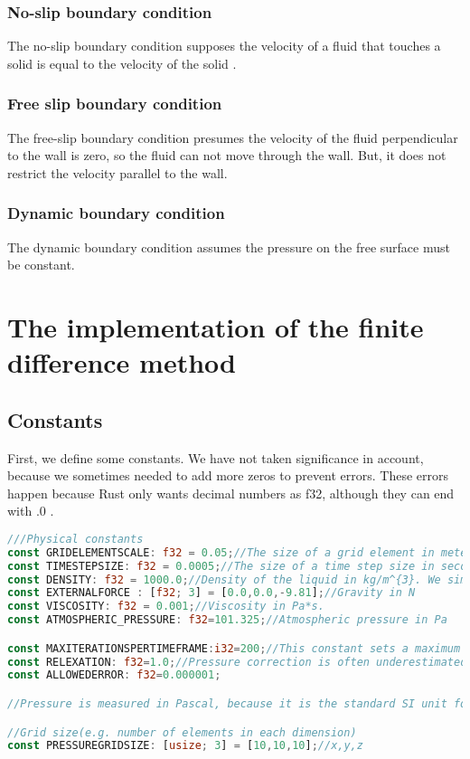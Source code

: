 \documentclass{article}
\begin{document}
\subsubsection{No-slip boundary condition} \label{no-slip boundary condition}
The no-slip boundary condition supposes the velocity of a fluid that touches a solid is equal to the velocity of the solid \cite{no-slip boundary condition}.
\subsubsection{Free slip boundary condition}
The free-slip boundary condition presumes the velocity of the fluid perpendicular to the wall is zero, so the fluid can not move through the wall. But, it does not restrict the velocity parallel to the wall.\cite{free slip boundary condition} 
\subsubsection{Dynamic boundary condition}
The dynamic boundary condition assumes the pressure on the free surface must be constant.
\newpage
\section{The implementation of the finite difference method}
\subsection{Constants} \label{Constants}
First, we define some constants. We have not taken significance in account, because we sometimes needed to add more zeros to prevent errors. These errors happen because Rust only wants decimal numbers as f32, although they can end with .0 .
\begin{lstlisting}[language=Rust, style=boxed, breaklines=true]
///Physical constants
const GRIDELEMENTSCALE: f32 = 0.05;//The size of a grid element in meters(denoted in equations as delta x)
const TIMESTEPSIZE: f32 = 0.0005;//The size of a time step size in seconds
const DENSITY: f32 = 1000.0;//Density of the liquid in kg/m^{3}. We simulate water.
const EXTERNALFORCE : [f32; 3] = [0.0,0.0,-9.81];//Gravity in N
const VISCOSITY: f32 = 0.001;//Viscosity in Pa*s.
const ATMOSPHERIC_PRESSURE: f32=101.325;//Atmospheric pressure in Pa

const MAXITERATIONSPERTIMEFRAME:i32=200;//This constant sets a maximum so the computer can not get in an infinite loop.
const RELEXATION: f32=1.0;//Pressure correction is often underestimated, this factor should be between 1.4 and 1.8.
const ALLOWEDERROR: f32=0.000001; 

//Pressure is measured in Pascal, because it is the standard SI unit for pressure.

//Grid size(e.g. number of elements in each dimension)
const PRESSUREGRIDSIZE: [usize; 3] = [10,10,10];//x,y,z
\end{lstlisting}
\newpage
\end{document}
